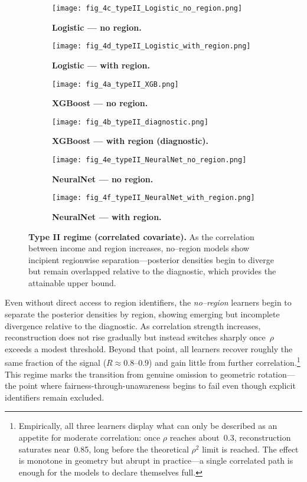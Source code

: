 \documentclass[11pt]{article}
\begin{document}
\begin{figure}[H]
  \centering
  \begin{subfigure}[t]{0.48\textwidth}
    \texttt{[image: fig\_4c\_typeII\_Logistic\_no\_region.png]}
    \caption{\textbf{Logistic — no region.}}
  \end{subfigure}
  \hfill
  \begin{subfigure}[t]{0.48\textwidth}
    \texttt{[image: fig\_4d\_typeII\_Logistic\_with\_region.png]}
    \caption{\textbf{Logistic — with region.}}
  \end{subfigure}
  
  \begin{subfigure}[t]{0.48\textwidth}
    \texttt{[image: fig\_4a\_typeII\_XGB.png]}
    \caption{\textbf{XGBoost — no region.}}
  \end{subfigure}
  \hfill
  \begin{subfigure}[t]{0.48\textwidth}
    \texttt{[image: fig\_4b\_typeII\_diagnostic.png]}
    \caption{\textbf{XGBoost — with region (diagnostic).}}
  \end{subfigure}

  \begin{subfigure}[t]{0.48\textwidth}
    \texttt{[image: fig\_4e\_typeII\_NeuralNet\_no\_region.png]}
    \caption{\textbf{NeuralNet — no region.}}
  \end{subfigure}
  \hfill
  \begin{subfigure}[t]{0.48\textwidth}
    \texttt{[image: fig\_4f\_typeII\_NeuralNet\_with\_region.png]}
    \caption{\textbf{NeuralNet — with region.}}
  \end{subfigure}

  \caption{\textbf{Type II regime (correlated covariate).}
  As the correlation between income and region increases, no–region models show
  incipient regionwise separation—posterior densities begin to diverge but remain
  overlapped relative to the diagnostic, which provides the attainable upper bound.}
  \label{fig:typeII-full}
\end{figure}
Even without direct access to region identifiers,
the \emph{no–region} learners begin to
separate the posterior densities by region, showing emerging but incomplete
divergence relative to the diagnostic.
As correlation strength increases, reconstruction does not rise gradually but instead
switches sharply once~$\rho$ exceeds a modest threshold.
Beyond that point, all learners recover roughly the same fraction of the signal
($R\!\approx\!0.8$–$0.9$) and gain little from further correlation.\footnote{%
Empirically, all three learners display what can only be described as an appetite
for moderate correlation: once $\rho$ reaches about~0.3, reconstruction saturates near~0.85,
long before the theoretical $\rho^2$ limit is reached.  
The effect is monotone in geometry but abrupt in practice—a single correlated path is enough
for the models to declare themselves full.}
This regime marks the transition from genuine omission to geometric rotation—
the point where fairness-through-unawareness begins to fail even though explicit identifiers remain excluded.
\end{document}
